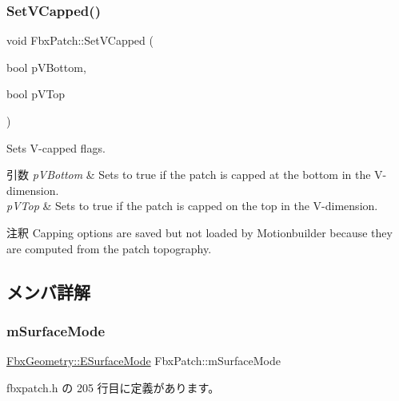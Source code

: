 \subsubsection{\texorpdfstring{Set\+V\+Capped()}{SetVCapped()}}
{\footnotesize\ttfamily void Fbx\+Patch\+::\+Set\+V\+Capped (\begin{DoxyParamCaption}\item[{bool}]{p\+V\+Bottom,  }\item[{bool}]{p\+V\+Top }\end{DoxyParamCaption})}

Sets V-\/capped flags. 
\begin{DoxyParams}{引数}
{\em p\+V\+Bottom} & Sets to {\ttfamily true} if the patch is capped at the bottom in the V-\/dimension. \\
\hline
{\em p\+V\+Top} & Sets to {\ttfamily true} if the patch is capped on the top in the V-\/dimension. \\
\hline
\end{DoxyParams}
\begin{DoxyRemark}{注釈}
Capping options are saved but not loaded by Motionbuilder because they are computed from the patch topography. 
\end{DoxyRemark}


\subsection{メンバ詳解}
\mbox{\label{class_fbx_patch_abad06185040d5492cf5731e9ff80fee6}} 
\subsubsection{\texorpdfstring{m\+Surface\+Mode}{mSurfaceMode}}
{\footnotesize\ttfamily \hyperlink{class_fbx_geometry_adb9d2e34481a2cb40f1d783c665794db}{Fbx\+Geometry\+::\+E\+Surface\+Mode} Fbx\+Patch\+::m\+Surface\+Mode\hspace{0.3cm}{\ttfamily [protected]}}



 fbxpatch.\+h の 205 行目に定義があります。

\mbox{\label{class_fbx_patch_ace54e1a6eabcb3c3f8ca80a577e614bb}} 
